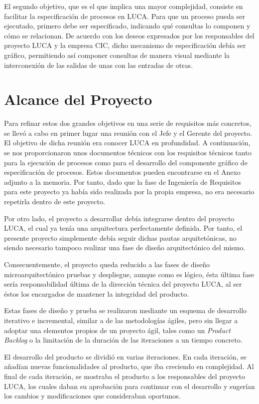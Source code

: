 El segundo objetivo, que es el que implica una mayor complejidad, consiste en facilitar la especificación de procesos en LUCA. Para que un proceso pueda ser ejecutado, primero debe ser especificado, indicando qué consultas lo componen y cómo se relacionan. De acuerdo con los deseos expresados por los responsables del proyecto LUCA y la empresa CIC, dicho mecanismo de especificación debía ser gráfico, permitiendo así componer consultas de manera visual mediante la interconexión de las salidas de unas con las entradas de otras.

\section{Alcance del Proyecto}

Para refinar estos dos grandes objetivos en una serie de requisitos más concretos, se llevó a cabo en primer lugar una reunión con el Jefe y el Gerente del proyecto. El objetivo de dicha reunión era conocer LUCA en profundidad. A continuación, se nos proporcionaron unos documentos técnicos con los requisitos técnicos tanto para la ejecución de procesos como para el desarrollo del componente gráfico de especificación de procesos. Estos documentos pueden encontrarse en el Anexo adjunto a la memoria. Por tanto, dado que la fase de Ingeniería de Requisitos para este proyecto ya había sido realizada por la propia empresa, no era necesario repetirla dentro de este proyecto. 

Por otro lado, el proyecto a desarrollar debía integrarse dentro del proyecto LUCA, el cual ya tenía una arquitectura perfectamente definida. Por tanto, el presente proyecto simplemente debía seguir dichas pautas arquitetónicas, no siendo necesario tampoco realizar una fase de diseño arquitectónico del mismo. 

Consecuentemente, el proyecto queda reducido a las fases de diseño microarquitectónico pruebas y despliegue, aunque como es lógico, ésta última fase sería responsabilidad última de la dirección técnica del proyecto LUCA, al ser éstos los encargados de mantener la integridad del producto.

Estas fases de diseño y prueba se realizaron mediante un esquema de desarrollo iterativo e incremental, similar a de las metodologías ágiles, pero sin llegar a adoptar una elementos propios de un proyecto ágil, tales como un \emph{Product Backlog} o la limitación de la duración de las iteraciones a un tiempo concreto.

El desarrollo del producto se dividió en varias iteraciones. En cada iteración, se añadían nuevas funcionalidades al producto, que iba creciendo en complejidad. Al final de cada iteración, se mostraba el producto a los responsables del proyecto LUCA, los cuales daban su aprobación para continuar con el desarrollo y sugerían los cambios y modificaciones que consideraban oportunos. 

